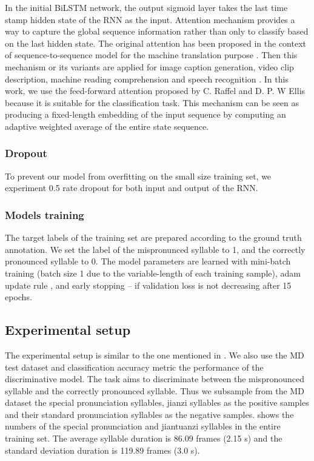 In the initial BiLSTM network, the output sigmoid layer takes the last time stamp hidden state of the RNN as the input. Attention mechanism provides a way to capture the global sequence information rather than only to classify based on the last hidden state. The original attention has been proposed in the context of sequence-to-sequence model for the machine translation purpose \cite{Bahdanau2014}. Then this mechanism or its variants are applied for image caption generation, video clip description, machine reading comprehension and speech recognition \cite{Cho2015,Xu2015,Hermann2015}. In this work, we use the feed-forward attention proposed by C. Raffel and D. P. W Ellis \cite{Raffel2015} because it is suitable for the classification task. This mechanism can be seen as producing a fixed-length embedding of the input sequence by computing an adaptive
weighted average of the entire state sequence.

\subsubsection{Dropout}

To prevent our model from overfitting on the small size training set, we experiment 0.5 rate dropout for both input and output of the RNN.

\subsubsection{Models training}

The target labels of the training set are prepared according to the ground truth annotation. We set the label of the mispronunced syllable to 1, and the correctly pronounced syllable to 0. The model parameters are learned with mini-batch training (batch size 1 due to the variable-length of each training sample), adam update rule \cite{kingma2014adam}, and early stopping -- if validation loss is not decreasing after 15 epochs. 

\subsection{Experimental setup}\label{sec:ch6:experimental_setup}

The experimental setup is similar to the one mentioned in . We also use the MD test dataset and classification accuracy metric the performance of the discriminative model. The task aims to discriminate between the mispronounced syllable and the correctly pronounced syllable. Thus we subsample from the MD dataset the special pronunciation syllables, \gls{jianzi} syllables as the positive samples and their standard pronunciation syllables as the negative samples.  shows the numbers of the special pronunciation and \gls{jiantuanzi} syllables in the entire training set. The average syllable duration is 86.09 frames (2.15 s) and the standard deviation duration is 119.89 frames (3.0 s). 

